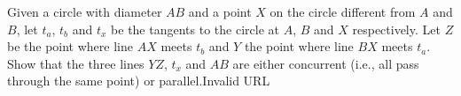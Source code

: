 Given a circle with diameter $AB$ and a point $X$ on the circle different from $A$ and $B$,  let $t_{a}$,  $t_{b}$ and $t_{x}$ be the tangents to the circle at $A$,  $B$ and $X$ respectively. Let $Z$ be the point where line $AX$ meets $t_{b}$ and $Y$ the point where line $BX$ meets $t_{a}$. Show that the three lines $YZ$,  $t_{x}$ and $AB$ are either concurrent (i.e., all pass through the same point) or parallel.Invalid URL